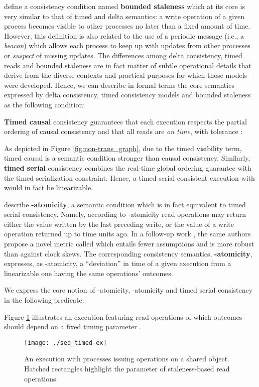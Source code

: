 \documentclass[letter, 11pt]{article}
\newcommand{\citeN}{\citet}
\renewcommand{\cite}{\citep}
\begin{document}
\citeN{Mahajan.Setty.ea:10} define a consistency condition named \textbf{bounded staleness} 
which at its core is very similar to that of timed and delta semantics: 
a write operation of a given process becomes visible to other processes no later than a fixed amount of time.
However, this definition is also related to the use of a periodic message (i.e., a \emph{beacon})
which allows each process to keep up with updates from other processes or \emph{suspect} of missing updates. 
The differences among delta consistency, timed reads and bounded staleness are in fact 
matter of subtle operational details that derive from the diverse contexts 
and practical purposes for which those models were developed.
Hence, we can describe in formal terms the core semantics expressed by delta consistency, timed consistency models and bounded staleness as the following condition:


\textbf{Timed causal} consistency \cite{Torres-Rojas.Meneses.05} 
guarantees that each execution respects the partial ordering of causal consistency 
and that all reads are \emph{on time}, with tolerance : 

As depicted in Figure \ref{fig:non-trans_graph}, due to the timed visibility term, timed causal is a semantic condition stronger than causal consistency. 
Similarly, \textbf{timed serial} consistency \cite{Torres-Rojas.Meneses.05} 
combines the real-time global ordering guarantee with the timed serialization constraint.
Hence, a timed serial consistent execution with  would in fact be linearizable.

\noindent \citeN{Golab.Li.ea:11} describe \textbf{-atomicity}, a semantic condition which is in fact equivalent to timed serial consistency.
Namely, according to -atomicity read operations may return either the value written by the last preceding write, or the value of a write operation returned up to  time units ago. 
In a follow-up work \cite{Golab.ea:14}, the same authors propose a novel metric called  which entails fewer assumptions and is more robust than  against clock skews.
The corresponding consistency semantics, \textbf{-atomicity}, expresses, as -atomicity,
a ``deviation'' in time of a given execution from a linearizable one having the same operations' outcomes.

\noindent We express the core notion of  -atomicity, -atomicity and timed serial consistency in the following
predicate:

Figure \ref{fig:seq_timed-ex} illustrates an execution featuring read operations of which outcomes should 
depend on a fixed timing parameter .
\begin{figure}[h]
	\centering
	\texttt{[image: ./seq\_timed-ex]} 	\caption{An execution with processes issuing operations on a shared object.\\
	Hatched rectangles highlight the  parameter of staleness-based read operations.}
	\label{fig:seq_timed-ex}
\end{figure}
\end{document}
